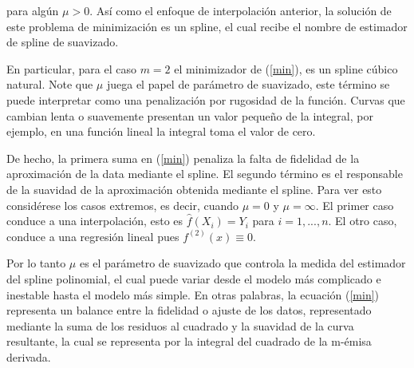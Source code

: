 \noindent para alg\'un $\mu > 0$. As\'i como el enfoque de interpolaci\'on anterior, la soluci\'on de este problema de minimizaci\'on es un spline, el cual recibe el nombre de estimador de spline de suavizado.


\hspace{0.4cm} En particular, para el caso $m=2$ el minimizador de (\ref{min}), es un spline c\'ubico natural. Note que $\mu$ juega el papel de par\'ametro de suavizado, este t\'ermino se puede interpretar como una penalizaci\'on por rugosidad de la funci\'on. Curvas que cambian lenta o suavemente presentan un valor peque\~no de la integral, por ejemplo, en una funci\'on lineal la integral toma el valor de cero.


\hspace{0.4cm} De hecho, la primera suma en (\ref{min}) penaliza la falta de fidelidad de la aproximaci\'on de la data mediante el spline. El segundo t\'ermino es el responsable de la suavidad de la aproximaci\'on obtenida mediante el spline. Para ver esto consid\'erese los casos extremos, es decir, cuando $\mu =0$ y $\mu=\infty$. El primer caso conduce a una interpolaci\'on, esto es $\hat{f}(X_{i})=Y_{i}$ para $i=1,...,n$. El otro caso, conduce a una regresi\'on lineal pues $f^{(2)}(x)\equiv 0$.


\hspace{0.4cm} Por lo tanto $\mu$ es el par\'ametro de suavizado que controla la medida del estimador del spline polinomial, el cual puede variar desde el modelo m\'as complicado e inestable hasta el modelo m\'as simple. En otras palabras, la ecuaci\'on (\ref{min}) representa un balance entre la fidelidad o ajuste de los datos, representado mediante la suma de los residuos al cuadrado y la suavidad de la curva resultante, la cual se representa por la integral del cuadrado de la m-\'emisa derivada.


